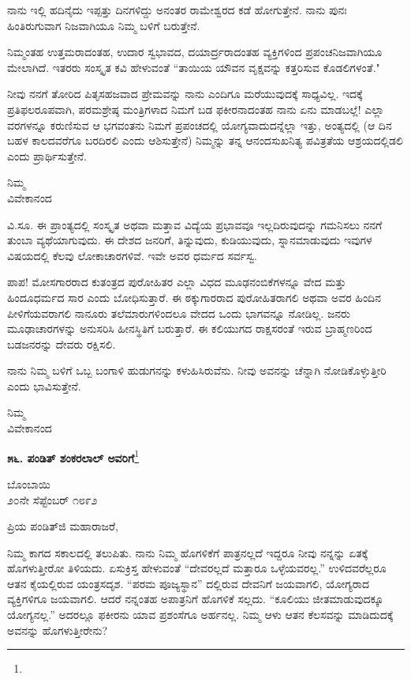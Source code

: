 ನಾನು ಇಲ್ಲಿ ಹದಿನೈದು ಇಪ್ಪತ್ತು ದಿನಗಳಿದ್ದು ಅನಂತರ ರಾಮೇಶ್ವರದ ಕಡೆ ಹೋಗುತ್ತೇನೆ. ನಾನು ಪುನಃ ಹಿಂತಿರುಗುವಾಗ ನಿಜವಾಗಿಯೂ ನಿಮ್ಮ ಬಳಿಗೆ ಬರುತ್ತೇನೆ.

ನಿಮ್ಮಂತಹ ಉತ್ತಮರಾದಂತಹ, ಉದಾರ ಸ್ವಭಾವದ, ದಯಾರ್ದ್ರರಾದಂತಹ ವ್ಯಕ್ತಿಗಳಿಂದ ಪ್ರಪಂಚನಿಜವಾಗಿಯೂ ಮೇಲಾಗಿದೆ. ಇತರರು ಸಂಸ್ಕೃತ ಕವಿ ಹೇಳುವಂತೆ ``ತಾಯಿಯ ಯೌವನ ವೃಕ್ಷವನ್ನು ಕತ್ತರಿಸುವ ಕೊಡಲಿಗಳಂತೆ."

ನೀವು ನನಗೆ ತೋರಿದ ಪಿತೃಸಹಜವಾದ ಪ್ರೇಮವನ್ನು ನಾನು ಎಂದಿಗೂ ಮರೆಯುವುದಕ್ಕೆ ಸಾಧ್ಯವಿಲ್ಲ. ಇದಕ್ಕೆ ಪ್ರತಿಫಲರೂಪವಾಗಿ, ಪರಮಶ್ರೇಷ್ಠ ಮಂತ್ರಿಗಳಾದ ನಿಮಗೆ ಬಡ ಫಕೀರನಾದಂತಹ ನಾನು ಏನು ಮಾಡಬಲ್ಲೆ! ಎಲ್ಲಾ ವರಗಳನ್ನೂ ಕರುಣಿಸುವ ಆ ಭಗವಂತನು ನಿಮಗೆ ಪ್ರಪಂಚದಲ್ಲಿ ಯೋಗ್ಯವಾದುದನ್ನೆಲ್ಲಾ ಇತ್ತು, ಅಂತ್ಯದಲ್ಲಿ (ಆ ದಿನ ಬಹಳ ಕಾಲದವರೆಗೂ ಬರದಿರಲಿ ಎಂದು ಆಶಿಸುತ್ತೇನೆ) ನಿಮ್ಮನ್ನು ತನ್ನ ಆನಂದಸುಖನಿತ್ಯ ಪವಿತ್ರತೆಯ ಆಶ್ರಯದಲ್ಲಿಡಲಿ ಎಂದು ಪ್ರಾರ್ಥಿಸುತ್ತೇನೆ.

{\flushright
ನಿಮ್ಮ\\ವಿವೇಕಾನಂದ\par}

\medskip

ವಿ.ಸೂ. \enginline{-}ಈ ಪ್ರಾಂತ್ಯದಲ್ಲಿ ಸಂಸ್ಕೃತ ಅಥವಾ ಮತ್ತಾವ ವಿದ್ಯೆಯ ಪ್ರಭಾವವೂ ಇಲ್ಲದಿರುವುದನ್ನು ಗಮನಿಸಲು ನನಗೆ ತುಂಬಾ ವ್ಯಥೆಯಾಗುವುದು. ಈ ದೇಶದ ಜನರಿಗೆ, ತಿನ್ನುವುದು, ಕುಡಿಯುವುದು, ಸ್ನಾನಮಾಡುವುದು ಇವುಗಳ ವಿಷಯದಲ್ಲಿ ಕೆಲವು ಲೋಕಾಚಾರಗಳಿವೆ. ಇವೇ ಅವರ ಧರ್ಮದ ಸರ್ವಸ್ವ.

ಪಾಪ! ಮೋಸಗಾರರಾದ ಕುತಂತ್ರದ ಪುರೋಹಿತರ ಎಲ್ಲಾ ವಿಧದ ಮೂಢನಂಬಿಕೆಗಳನ್ನೂ ವೇದ ಮತ್ತು ಹಿಂದೂಧರ್ಮದ ಸಾರ ಎಂದು ಬೋಧಿಸುತ್ತಾರೆ. ಈ ಠಕ್ಕುಗಾರರಾದ ಪುರೋಹಿತರಾಗಲಿ ಅಥವಾ ಅವರ ಹಿಂದಿನ ಪೀಳಿಗೆಯವರಾಗಲಿ ನಾನೂರು ತಲೆಮಾರುಗಳಿಂದಲೂ ವೇದದ ಒಂದು ಭಾಗವನ್ನೂ ನೋಡಿಲ್ಲ. ಜನರು ಮೂಢಾಚಾರಗಳನ್ನು ಅನುಸರಿಸಿ ಹೀನಸ್ಥಿತಿಗೆ ಬರುತ್ತಾರೆ. ಈ ಕಲಿಯುಗದ ರಾಕ್ಷಸರಂತೆ ಇರುವ ಬ್ರಾಹ್ಮಣರಿಂದ ಬಡಜನರನ್ನು ದೇವರು ರಕ್ಷಿಸಲಿ.

ನಾನು ನಿಮ್ಮ ಬಳಿಗೆ ಒಬ್ಬ ಬಂಗಾಳಿ ಹುಡುಗನನ್ನು ಕಳುಹಿಸಿರುವೆನು. ನೀವು ಅವನನ್ನು ಚೆನ್ನಾಗಿ ನೋಡಿಕೊಳ್ಳುತ್ತೀರಿ ಎಂದು ಭಾವಿಸುತ್ತೇನೆ.


{\flushright
ನಿಮ್ಮ\\ವಿವೇಕಾನಂದ\par}

\begin{center}
\textbf{೫೬. ಪಂಡಿತ್‌ ಶಂಕರಲಾಲ್ ಅವರಿಗೆ}\footnote{}
\end{center}


\begin{flushright}
ಬೊಂಬಾಯಿ\\೨೦ನೇ ಸೆಪ್ಟೆಂಬರ್ ೧೮೯೨
\end{flushright}

\noindent
ಪ್ರಿಯ ಪಂಡಿತ್‌ಜಿ ಮಹಾರಾಜರೆ,

ನಿಮ್ಮ ಕಾಗದ ಸಕಾಲದಲ್ಲಿ ತಲುಪಿತು. ನಾನು ನಿಮ್ಮ ಹೊಗಳಿಕೆಗೆ ಪಾತ್ರನಲ್ಲದೆ ಇದ್ದರೂ ನೀವು ನನ್ನನ್ನು ಏತಕ್ಕೆ ಹೊಗಳುತ್ತೀರೋ ತಿಳಿಯದು. ಏಸುಕ್ರಿಸ್ತ ಹೇಳುವಂತೆ “ದೇವರಲ್ಲದೆ ಮತ್ತಾರೂ ಒಳ್ಳೆಯವರಲ್ಲ.” ಉಳಿದವರೆಲ್ಲರೂ ಆತನ ಕೈಯಲ್ಲಿರುವ ಯಂತ್ರಸದೃಶ.  “ಪರಮ ಪೂಜ್ಯಸ್ಥಾನ” ದಲ್ಲಿರುವ ದೇವನಿಗೆ ಜಯವಾಗಲಿ, ಯೋಗ್ಯರಾದ ವ್ಯಕ್ತಿಗಳಿಗೂ ಜಯವಾಗಲಿ. ಆದರೆ ನನ್ನಂತಹ ಅಪಾತ್ರನಿಗೆ ಹೊಗಳಿಕೆ ಸಲ್ಲದು. “ಕೂಲಿಯು ಜೀತಮಾಡುವುದಕ್ಕೂ ಯೋಗ್ಯನಲ್ಲ.” ಅದರಲ್ಲೂ ಫಕೀರನು ಯಾವ ಪ್ರಶಂಸೆಗೂ ಅರ್ಹನಲ್ಲ. ನಿಮ್ಮ ಆಳು ಆತನ ಕೆಲಸವನ್ನು ಮಾಡಿದುದಕ್ಕೆ ಅವನನ್ನು ಹೊಗಳುತ್ತೀರೇನು?

